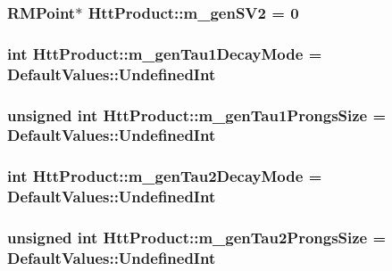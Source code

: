 \label{classHttProduct_ae3617dc56d9ef3bb87dacb354286f3fb}
\hypertarget{classHttProduct_a519090c41ad7a95fde740478e4a0717f}{
\subsubsection[{m\_\-genSV2}]{\setlength{\rightskip}{0pt plus 5cm}RMPoint$\ast$ {\bf HttProduct::m\_\-genSV2} = 0}}
\label{classHttProduct_a519090c41ad7a95fde740478e4a0717f}
\hypertarget{classHttProduct_a55c67bddc9cd45d950cbc943a63f4632}{
\subsubsection[{m\_\-genTau1DecayMode}]{\setlength{\rightskip}{0pt plus 5cm}int {\bf HttProduct::m\_\-genTau1DecayMode} = DefaultValues::UndefinedInt}}
\label{classHttProduct_a55c67bddc9cd45d950cbc943a63f4632}
\hypertarget{classHttProduct_abb0ed1f2a021227a3f5730fb133dc293}{
\subsubsection[{m\_\-genTau1ProngsSize}]{\setlength{\rightskip}{0pt plus 5cm}unsigned int {\bf HttProduct::m\_\-genTau1ProngsSize} = DefaultValues::UndefinedInt}}
\label{classHttProduct_abb0ed1f2a021227a3f5730fb133dc293}
\hypertarget{classHttProduct_a92b05122d3b7e10810649fb55b51d7cc}{
\subsubsection[{m\_\-genTau2DecayMode}]{\setlength{\rightskip}{0pt plus 5cm}int {\bf HttProduct::m\_\-genTau2DecayMode} = DefaultValues::UndefinedInt}}
\label{classHttProduct_a92b05122d3b7e10810649fb55b51d7cc}
\hypertarget{classHttProduct_a48cfa5c2f5cf0b2909858ac0dfc3badc}{
\subsubsection[{m\_\-genTau2ProngsSize}]{\setlength{\rightskip}{0pt plus 5cm}unsigned int {\bf HttProduct::m\_\-genTau2ProngsSize} = DefaultValues::UndefinedInt}}
